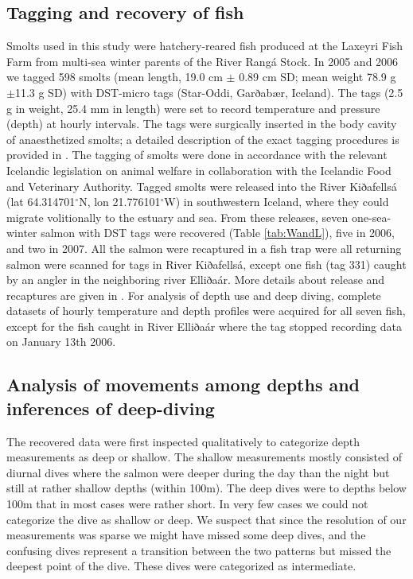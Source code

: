 \subsection{Tagging and recovery of fish}
Smolts used in this study were hatchery-reared fish produced at the Laxeyri Fish Farm from multi-sea winter parents of the River Rangá Stock. 
In 2005 and 2006 we tagged 598 smolts (mean length, 19.0 cm $\pm$ 0.89 cm SD; mean weight 78.9 g $\pm$11.3 g SD) with DST-micro tags (Star-Oddi, Garðabær, Iceland). 
The tags (2.5 g in weight, 25.4 mm in length) were set to record temperature and pressure (depth) at hourly intervals. 
The tags were surgically inserted in the body cavity of anaesthetized smolts; a detailed description of the exact tagging procedures is provided in \cite{Gudjonsson2015}. 
The tagging of smolts were done in accordance with the relevant Icelandic legislation on animal welfare in collaboration with the Icelandic Food and Veterinary Authority.
Tagged smolts were released into the River Kiðafellsá (lat 64.314701$^\circ$N, lon 21.776101$^\circ$W) in southwestern Iceland, where they could migrate volitionally to the estuary and sea. 
From these releases, seven one-sea-winter salmon with DST tags were recovered (Table \ref{tab:WandL}), five in 2006, and two in 2007. 
All the salmon were recaptured in a fish trap were all returning salmon  were scanned for tags in River Kiðafellsá, except one fish (tag 331) caught by an angler in the neighboring river Elliðaár. 
More details about release and recaptures are given in \cite{Gudjonsson2015}.
For analysis of depth use and deep diving, complete datasets of hourly temperature and depth profiles were acquired for all seven fish, except for the fish caught in River Elliðaár where the tag stopped recording data on January 13th 2006.

\subsection{Analysis of movements among depths and inferences of deep-diving}
The recovered data were first inspected qualitatively to categorize depth measurements as deep or shallow.  The shallow measurements mostly consisted of diurnal dives where the salmon were deeper during the day than the night but still at rather shallow depths (within 100m). 
The deep dives were to depths below 100m that in most cases were rather short. In very few cases we could not categorize the dive as shallow or deep. 
We suspect that since the resolution of our measurements was sparse we might have missed some deep dives, and the confusing dives represent a transition between the two patterns but missed the deepest point of the dive. These dives were categorized as intermediate.

